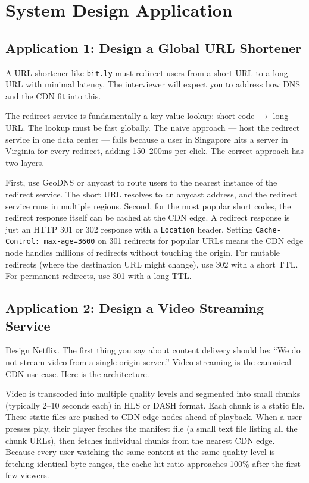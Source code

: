 \documentclass[11pt,a4paper]{article}
\begin{document}
\section{System Design Application}

\subsection{Application 1: Design a Global URL Shortener}

A URL shortener like \texttt{bit.ly} must redirect users from a short URL to a long URL with minimal latency. The interviewer will expect you to address how DNS and the CDN fit into this.

The redirect service is fundamentally a key-value lookup: short code $\to$ long URL. The lookup must be fast globally. The naive approach --- host the redirect service in one data center --- fails because a user in Singapore hits a server in Virginia for every redirect, adding 150--200ms per click. The correct approach has two layers.

First, use GeoDNS or anycast to route users to the nearest instance of the redirect service. The short URL resolves to an anycast address, and the redirect service runs in multiple regions. Second, for the most popular short codes, the redirect response itself can be cached at the CDN edge. A redirect response is just an HTTP 301 or 302 response with a \texttt{Location} header. Setting \texttt{Cache-Control: max-age=3600} on 301 redirects for popular URLs means the CDN edge node handles millions of redirects without touching the origin. For mutable redirects (where the destination URL might change), use 302 with a short TTL. For permanent redirects, use 301 with a long TTL.

\subsection{Application 2: Design a Video Streaming Service}

Design Netflix. The first thing you say about content delivery should be: ``We do not stream video from a single origin server.'' Video streaming is the canonical CDN use case. Here is the architecture.

Video is transcoded into multiple quality levels and segmented into small chunks (typically 2--10 seconds each) in HLS or DASH format. Each chunk is a static file. These static files are pushed to CDN edge nodes ahead of playback. When a user presses play, their player fetches the manifest file (a small text file listing all the chunk URLs), then fetches individual chunks from the nearest CDN edge. Because every user watching the same content at the same quality level is fetching identical byte ranges, the cache hit ratio approaches 100\% after the first few viewers.
\end{document}
